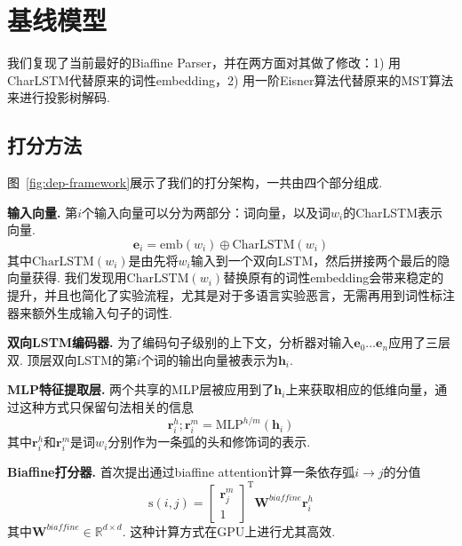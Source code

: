 \section{基线模型}
\label{sec:dep-basic-model}

我们复现了当前最好的Biaffine Parser\cite{Timothy-d17-biaffine}，并在两方面对其做了修改：1) 用CharLSTM代替原来的词性embedding，2) 用一阶Eisner算法\cite{eisner-2000-iwptbook}代替原来的MST算法来进行投影树解码.

\subsection{打分方法}
图~\ref{fig:dep-framework}展示了我们的打分架构，一共由四个部分组成.

\textbf{输入向量.}
第$i$个输入向量可以分为两部分：词向量，以及词$w_i$的CharLSTM表示向量.
\begin{equation}
    \label{eq:input}
    \mathbf{e}_i=\mathrm{emb}({w_i}) \oplus \mathrm{CharLSTM}(w_i)
\end{equation}
其中$\mathrm{CharLSTM}(w_i)$是由先将$w_i$输入到一个双向LSTM，然后拼接两个最后的隐向量获得\cite{lample-etal-2016-neural}.
我们发现用$\mathrm{CharLSTM}(w_i)$替换原有的词性embedding会带来稳定的提升，并且也简化了实验流程，尤其是对于多语言实验恶言，无需再用到词性标注器来额外生成输入句子的词性.

\noindent\textbf{双向LSTM编码器.}
为了编码句子级别的上下文，分析器对输入$\mathbf{e}_0 \dots \mathbf{e}_n$应用了三层双.
顶层双向LSTM的第$i$个词的输出向量被表示为$\mathbf{h}_i$.

\noindent\textbf{MLP特征提取层.}
两个共享的MLP层被应用到了$\mathbf{h}_i$上来获取相应的低维向量，通过这种方式只保留句法相关的信息
\begin{equation}
    \label{mlp-arc}
    \mathbf{r}_i^{h}; \mathbf{r}_i^{m} =\mathrm{MLP}^{h/m} \left( \mathbf{h}_i \right)
\end{equation}
其中$\mathbf{r}_i^{h}$和$\mathbf{r}_i^{m}$是词$w_i$分别作为一条弧的头和修饰词的表示.

\noindent\textbf{Biaffine打分器.}
\cite{Timothy-d17-biaffine}首次提出通过biaffine attention计算一条依存弧$i \rightarrow j$的分值
\begin{equation} \label{eq:biaffine}
    \mathrm{s}(i,j) =  \left[
        \begin{array}{c}
            \mathbf{r}_{j}^{m} \\
            1
        \end{array}
        \right]^\mathrm{T}
    \mathbf{W}^\textit{biaffine}  \mathbf{r}_{i}^{h}
\end{equation}
其中$\mathbf{W}^\textit{biaffine} \in \mathbb{R}^{d \times d}$.
这种计算方式在GPU上进行尤其高效.

